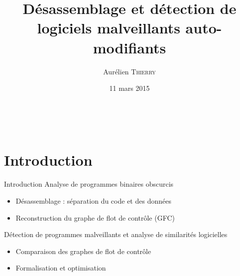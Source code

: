 \documentclass{beamer}
\title[Désassemblage et détection de logiciels malveillants auto-modifiants]{Désassemblage et détection de logiciels malveillants auto-modifiants}
\author{Aurélien \textsc{Thierry}}%
\date{11 mars 2015}
\begin{document}
\makeatletter
  \gdef\inserttotalframenumber{\inserttotalframenumbernew}
\makeatother


\begin{frame}[plain]
\titlepage
\begin{figure}[ht]
\begin{center}
  \quad
  \
\quad
\end{center}
\label{fig:CFGConstrNorm}
\end{figure}
\end{frame}

\section{Introduction}
\begin{frame}{Introduction}
Analyse de programmes binaires obscurcis
\begin{itemize}
 \item Désassemblage : séparation du code et des données
 \item Reconstruction du graphe de flot de contrôle (GFC)
\end{itemize}

Détection de programmes malveillants et analyse de similarités logicielles
\begin{itemize}
 \item Comparaison des graphes de flot de contrôle
 \item Formalisation et optimisation
\end{itemize}

\end{frame}


% 
% 
\end{document}
